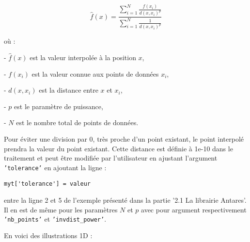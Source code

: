 \[
\hat{f}(x) = \frac{\sum_{i=1}^{N} \frac{f(x_i)}{d(x, x_i)^p}}{\sum_{i=1}^{N} \frac{1}{d(x, x_i)^p}}
\]

où :

- \(\hat{f}(x)\) est la valeur interpolée à la position \(x\),

- \(f(x_i)\) est la valeur connue aux points de données \(x_i\),

- \(d(x, x_i)\) est la distance entre \(x\) et \(x_i\),

- \(p\) est le paramètre de puissance,

- \(N\) est le nombre total de points de données.

\vspace*{0,5cm}

Pour éviter une division par 0, très proche d'un point existant, le point interpolé prendra la valeur du point existant. Cette distance est définie à 1e-10 dans le traitement et peut être modifiée par l'utilisateur en ajustant l'argument \texttt{'tolerance'} en ajoutant la ligne :
\begin{lstlisting}[]
    myt['tolerance'] = valeur
\end{lstlisting}
entre la ligne 2 et 5 de l'exemple présenté dans la partie '2.1 La librairie Antares'.
Il en est de même pour les paramètres \(N\) et \(p\) avec pour argument respectivement \texttt{'nb\_points'} et \texttt{'invdist\_power'}.


\vspace*{0,5cm}

\newpage

En voici des illustrations 1D :

